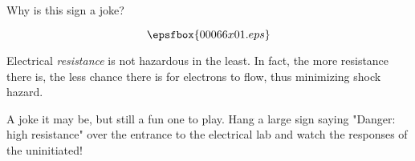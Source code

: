

Why is this sign a joke?

$$\epsfbox{00066x01.eps}$$







Electrical {\it resistance} is not hazardous in the least.  In fact, the more resistance there is, the less chance there is for electrons to flow, thus minimizing shock hazard.







A joke it may be, but still a fun one to play.  Hang a large sign saying "Danger: high resistance" over the entrance to the electrical lab and watch the responses of the uninitiated!




